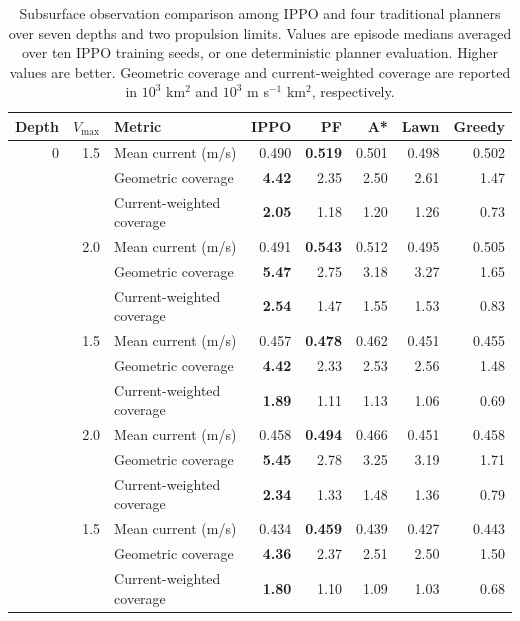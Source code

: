 \begin{table}[p]
\centering
\caption{Subsurface observation comparison among IPPO and four traditional planners over seven depths and two propulsion limits. Values are episode medians averaged over ten IPPO training seeds, or one deterministic planner evaluation. Higher values are better. Geometric coverage and current-weighted coverage are reported in $10^3$ km$^2$ and $10^3$ m s$^{-1}$ km$^2$, respectively.}
\label{tab:underwater_methods_10seed}
\scriptsize
\setlength{\tabcolsep}{5pt}
\begin{tabular*}{\textwidth}{@{\extracolsep{\fill}}rrlrrrrr@{}}
\toprule
Depth & $V_{\max}$ & Metric & IPPO & PF & A* & Lawn & Greedy \\
\midrule
0 & 1.5 & Mean current (m/s) & 0.490 & \textbf{0.519} & 0.501 & 0.498 & 0.502 \\
 &  & Geometric coverage & \textbf{4.42} & 2.35 & 2.50 & 2.61 & 1.47 \\
 &  & Current-weighted coverage & \textbf{2.05} & 1.18 & 1.20 & 1.26 & 0.73 \\
\addlinespace[1pt]
0 & 2.0 & Mean current (m/s) & 0.491 & \textbf{0.543} & 0.512 & 0.495 & 0.505 \\
 &  & Geometric coverage & \textbf{5.47} & 2.75 & 3.18 & 3.27 & 1.65 \\
 &  & Current-weighted coverage & \textbf{2.54} & 1.47 & 1.55 & 1.53 & 0.83 \\
\addlinespace[1pt]
\midrule
10 & 1.5 & Mean current (m/s) & 0.457 & \textbf{0.478} & 0.462 & 0.451 & 0.455 \\
 &  & Geometric coverage & \textbf{4.42} & 2.33 & 2.53 & 2.56 & 1.48 \\
 &  & Current-weighted coverage & \textbf{1.89} & 1.11 & 1.13 & 1.06 & 0.69 \\
\addlinespace[1pt]
10 & 2.0 & Mean current (m/s) & 0.458 & \textbf{0.494} & 0.466 & 0.451 & 0.458 \\
 &  & Geometric coverage & \textbf{5.45} & 2.78 & 3.25 & 3.19 & 1.71 \\
 &  & Current-weighted coverage & \textbf{2.34} & 1.33 & 1.48 & 1.36 & 0.79 \\
\addlinespace[1pt]
\midrule
20 & 1.5 & Mean current (m/s) & 0.434 & \textbf{0.459} & 0.439 & 0.427 & 0.443 \\
 &  & Geometric coverage & \textbf{4.36} & 2.37 & 2.51 & 2.50 & 1.50 \\
 &  & Current-weighted coverage & \textbf{1.80} & 1.10 & 1.09 & 1.03 & 0.68 \\

\end{tabular*}
\end{table}
